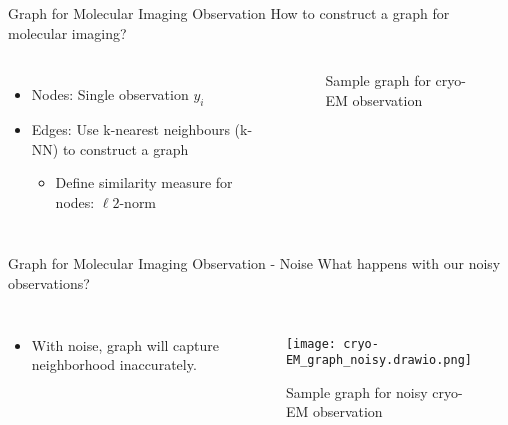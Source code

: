 \begin{frame}{Graph for Molecular Imaging Observation}
  \alert<1>{How to construct a graph for molecular imaging?}
  \pause
  \begin{columns}
    \begin{itemize}
      \item Nodes: Single observation $y_i$
      \item<3-> Edges: Use k-nearest neighbours (k-NN) to construct a graph
      \begin{itemize}
        \item<5-> Define similarity measure for nodes: $\ell2$-norm
      \end{itemize}
    \end{itemize}

    \begin{figure}
      \centering




      \caption{Sample graph for cryo-EM observation}        
    \end{figure}
  \end{columns}
\end{frame}

\begin{frame}{Graph for Molecular Imaging Observation - Noise}
  \alert<1>{What happens with our noisy observations?}
  \pause
  \begin{columns}
    \begin{itemize}
      \item With noise, graph will capture neighborhood inaccurately.
    \end{itemize}

    \begin{figure}
      \centering
      \texttt{[image: cryo-EM\_graph\_noisy.drawio.png]}
      \caption{Sample graph for noisy cryo-EM observation}        
    \end{figure}
  \end{columns}
\end{frame}


